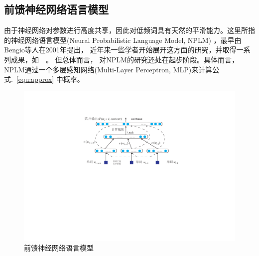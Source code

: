 \subsection{前馈神经网络语言模型}
由于神经网络对参数进行高度共享，因此对低频词具有天然的平滑能力。这里所指的神经网络语言模型(Neural Probabilistic Language Model, NPLM) ，最早由Bengio等人在2001年提出， 近年来一些学者开始展开这方面的研究，并取得一系列成果，如~\cite{DBLP:conf/acl/BaroniDK14,DBLP:journals/sigkdd/BellK07,DBLP:journals/pami/BengioCV13,DBLP:journals/tnn/BengioSF94}~。 但总体而言， 对NPLM的研究还处在起步阶段。具体而言，NPLM通过一个多层感知网络(Multi-Layer Perceptron, MLP)来计算公式.~\ref{equ:approx} 中概率。
\begin{figure}
  \centering
  \includegraphics[width=1\linewidth]{./figures/nplm.pdf}
  \caption{前馈神经网络语言模型}\label{fig:nplm}
\end{figure}

